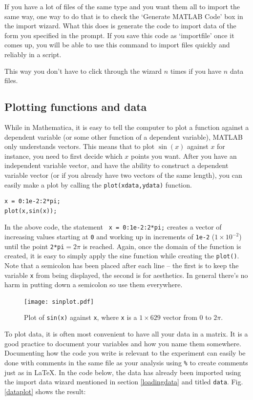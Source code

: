 \begin{exercise}
If you have a lot of files of the same type and you want them all to import the same way, one way to do that is to check the `Generate MATLAB Code' box in the import wizard. What this does is generate the code to import data of the form you specified in the prompt. If you save this code as `importfile' once it comes up, you will be able to use this command to import files quickly and reliably in a script.

This way you don't have to click through the wizard $n$ times if you have $n$ data files.%
\end{exercise}
\subsection{Plotting functions and data}
While in Mathematica, it is easy to tell the computer to plot a function against a dependent variable (or some other function of a dependent variable), MATLAB only understands vectors. This means that to plot $\sin(x)$ against $x$ for instance, you need to first decide which $x$ points you want. After you have an independent variable vector, and have the ability to construct a dependent variable vector (or if you already have two vectors of the same length), you can easily make a plot by calling the \verb|plot(xdata,ydata)| function.
\begin{framed}
\begin{verbatim}
x = 0:1e-2:2*pi;
plot(x,sin(x));
\end{verbatim}
\end{framed}
In the above code, the statement \verb| x = 0:1e-2:2*pi;| creates a vector of increasing values starting at \verb|0| and working up in increments of \verb|1e-2| ($1 \times 10^{-2}$) until the point \verb|2*pi|$=2\pi$ is reached. Again, once the domain of the function is created, it is easy to simply apply the sine function while creating the \texttt{plot()}. Note that a semicolon has been placed after each line -- the first is to keep the variable \verb|x| from being displayed, the second is for aesthetics. In general there's no harm in putting down a semicolon so use them everywhere.
\begin{figure}[H]
\centering
\texttt{[image: sinplot.pdf]}
\caption{Plot of \texttt{sin(x)} against \texttt{x}, where \texttt{x} is a $ 1 \times 629 $ vector from 0 to $2\pi$.}
\end{figure}
To plot data, it is often most convenient to have all your data in a matrix. It is a good practice to document your variables and how you name them somewhere. Documenting how the code you write is relevant to the experiment can easily be done with comments in the same file as your analysis using \texttt{\%} to create comments just as in \LaTeX. In the code below, the data has already been imported using the import data wizard mentioned 
in section \ref{loadingdata} and titled \texttt{data}. Fig. \ref{dataplot} shows the result:

